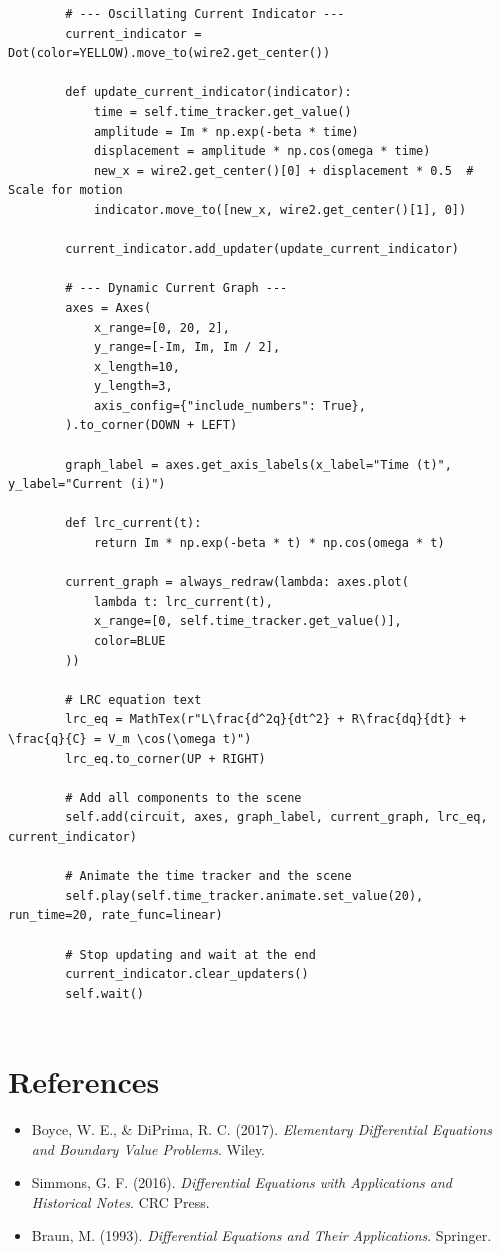 \documentclass[12pt,a4paper]{article}
\begin{document}
\begin{verbatim}
        # --- Oscillating Current Indicator ---
        current_indicator = Dot(color=YELLOW).move_to(wire2.get_center())

        def update_current_indicator(indicator):
            time = self.time_tracker.get_value()
            amplitude = Im * np.exp(-beta * time)
            displacement = amplitude * np.cos(omega * time)
            new_x = wire2.get_center()[0] + displacement * 0.5  # Scale for motion
            indicator.move_to([new_x, wire2.get_center()[1], 0])

        current_indicator.add_updater(update_current_indicator)

        # --- Dynamic Current Graph ---
        axes = Axes(
            x_range=[0, 20, 2],
            y_range=[-Im, Im, Im / 2],
            x_length=10,
            y_length=3,
            axis_config={"include_numbers": True},
        ).to_corner(DOWN + LEFT)

        graph_label = axes.get_axis_labels(x_label="Time (t)", y_label="Current (i)")

        def lrc_current(t):
            return Im * np.exp(-beta * t) * np.cos(omega * t)

        current_graph = always_redraw(lambda: axes.plot(
            lambda t: lrc_current(t),
            x_range=[0, self.time_tracker.get_value()],
            color=BLUE
        ))

        # LRC equation text
        lrc_eq = MathTex(r"L\frac{d^2q}{dt^2} + R\frac{dq}{dt} + \frac{q}{C} = V_m \cos(\omega t)")
        lrc_eq.to_corner(UP + RIGHT)

        # Add all components to the scene
        self.add(circuit, axes, graph_label, current_graph, lrc_eq, current_indicator)

        # Animate the time tracker and the scene
        self.play(self.time_tracker.animate.set_value(20), run_time=20, rate_func=linear)

        # Stop updating and wait at the end
        current_indicator.clear_updaters()
        self.wait()
            

\end{verbatim}
\section{References}

\begin{itemize}
    \item Boyce, W. E., \& DiPrima, R. C. (2017). \textit{Elementary Differential Equations and Boundary Value Problems}. Wiley.
    \item Simmons, G. F. (2016). \textit{Differential Equations with Applications and Historical Notes}. CRC Press.
    \item Braun, M. (1993). \textit{Differential Equations and Their Applications}. Springer.
\end{itemize}
\end{document}
